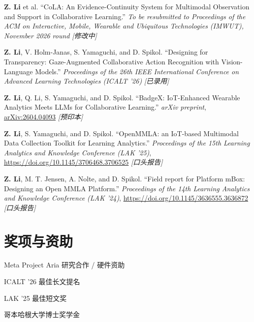 \documentclass[11pt,letterpaper]{report}
\begin{document}
    \begin{tablist}
        \item[2026] \tab{} \textbf{Z. Li} et al. \enquote{CoLA: An Evidence-Continuity System for Multimodal Observation and Support in Collaborative Learning.} \textit{To be resubmitted to Proceedings of the ACM on Interactive, Mobile, Wearable and Ubiquitous Technologies (IMWUT), November 2026 round} \textit{[修改中]}
        \item[2026] \tab{} \textbf{Z. Li}, V. Holm-Janas, S. Yamaguchi, and D. Spikol. \enquote{Designing for Transparency: Gaze-Augmented Collaborative Action Recognition with Vision-Language Models.} \textit{Proceedings of the 26th IEEE International Conference on Advanced Learning Technologies (ICALT '26)} \textit{[已录用]}
        \item[2026] \tab{} \textbf{Z. Li}, Q. Li, S. Yamaguchi, and D. Spikol. \enquote{BadgeX: IoT-Enhanced Wearable Analytics Meets LLMs for Collaborative Learning.} \textit{arXiv preprint}, \href{https://arxiv.org/abs/2604.04093}{arXiv:2604.04093} \textit{[预印本]}
        \item[2025] \tab{} \textbf{Z. Li}, S. Yamaguchi, and D. Spikol. \enquote{OpenMMLA: an IoT-based Multimodal Data Collection Toolkit for Learning Analytics.} \textit{Proceedings of the 15th Learning Analytics and Knowledge Conference (LAK '25)}, \href{https://doi.org/10.1145/3706468.3706525}{https://doi.org/10.1145/3706468.3706525} \textit{[口头报告]}
        \item[2024] \tab{} \textbf{Z. Li}, M. T. Jensen, A. Nolte, and D. Spikol. \enquote{Field report for Platform mBox: Designing an Open MMLA Platform.} \textit{Proceedings of the 14th Learning Analytics and Knowledge Conference (LAK '24)}, \href{https://doi.org/10.1145/3636555.3636872}{https://doi.org/10.1145/3636555.3636872} \textit{[口头报告]}
    \end{tablist}


    \section*{奖项与资助}

    \begin{tablist}
        \item[2026\phantom{--2027}] \tab{}Meta Project Aria 研究合作 / 硬件资助
        \item[2026\phantom{--2027}] \tab{}ICALT '26 最佳长文提名
        \item[2025\phantom{--2027}] \tab{}LAK '25 最佳短文奖
        \item[2024--2027] \tab{}哥本哈根大学博士奖学金
    \end{tablist}
\end{document}
